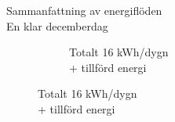 \begin{frame}{Sammanfattning av energiflöden\\En klar decemberdag}
\begin{figure}
{\begin{subfigure}[b]{0.55\textwidth}
                \caption*{Totalt 16 kWh/dygn \\+ tillförd energi}
        \end{subfigure}
        }
\end{figure}

\end{frame}
